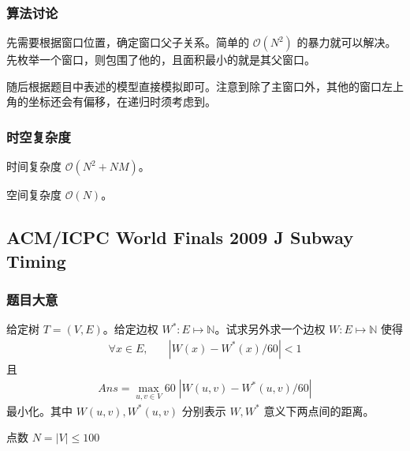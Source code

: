 			\subsubsection{算法讨论}	
				先需要根据窗口位置，确定窗口父子关系。简单的 $\mathcal{O}\left(N^2\right)$ 的暴力就可以解决。先枚举一个窗口，则包围了他的，且面积最小的就是其父窗口。
				
				随后根据题目中表述的模型直接模拟即可。注意到除了主窗口外，其他的窗口左上角的坐标还会有偏移，在递归时须考虑到。
			
			
			\subsubsection{时空复杂度}
				时间复杂度 $\mathcal{O}\left(N^2 + NM\right)$。
					
				空间复杂度 $\mathcal{O}\left(N\right)$。
		\newpage
		\subsection{ACM/ICPC World Finals 2009 J Subway Timing}
			\subsubsection{题目大意}
				给定树 $T = (V, E)$。给定边权 $W^* : E \mapsto \mathbb{N}$。试求另外求一个边权 $W : E \mapsto \mathbb{N}$ 使得
				\begin{align}
					\forall x \in E,\quad & | W(x) - W^*(x) / 60 | < 1  \label{2009J1}
				\end{align}
				且
				\begin{align}
					Ans = \max_{u, v \in V} 60 \; |W(u, v) - W^*(u, v) / 60 |
				\end{align}
				最小化。其中 $W(u, v), W^*(u, v)$ 分别表示 $W, W^*$ 意义下两点间的距离。 
				
				点数 $N = |V| \le 100$
